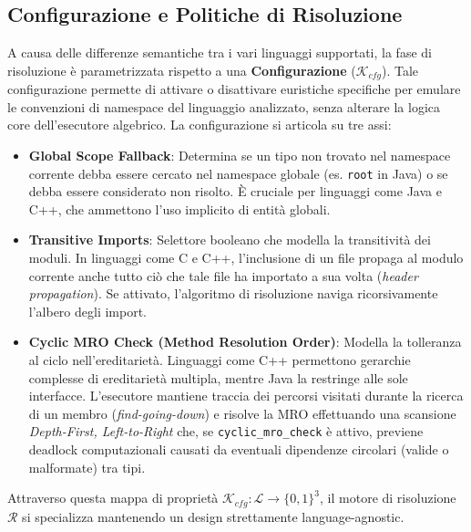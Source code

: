 \subsection{Configurazione e Politiche di Risoluzione}
A causa delle differenze semantiche tra i vari linguaggi supportati, la fase di
risoluzione è parametrizzata rispetto a una \textbf{Configurazione}
($\mathcal{K}_{cfg}$).
Tale configurazione permette di attivare o disattivare euristiche specifiche per
emulare le convenzioni di namespace del linguaggio analizzato, senza alterare
la logica core dell'esecutore algebrico. La configurazione si
articola su tre assi:
\begin{itemize}
  \item \textbf{Global Scope Fallback}: Determina se un tipo non
    trovato nel namespace corrente debba essere cercato nel namespace
    globale (es. \texttt{root} in Java) o se debba essere considerato
    non risolto. È cruciale per linguaggi come Java e C++, che
    ammettono l'uso implicito di entità globali.
  \item \textbf{Transitive Imports}: Selettore booleano che modella
    la transitività dei moduli. In linguaggi come C e C++,
    l'inclusione di un file propaga al modulo corrente anche tutto
    ciò che tale file ha importato a sua volta (\textit{header
    propagation}). Se attivato, l'algoritmo di risoluzione naviga
    ricorsivamente l'albero degli import.
  \item \textbf{Cyclic MRO Check (Method Resolution Order)}: Modella
    la tolleranza al ciclo nell'ereditarietà. Linguaggi come C++
    permettono gerarchie complesse di ereditarietà multipla, mentre
    Java la restringe alle sole interfacce. L'esecutore mantiene
    traccia dei percorsi visitati durante la ricerca di un membro
    (\textit{find-going-down}) e risolve la MRO effettuando una
    scansione \textit{Depth-First, Left-to-Right} che, se
    \texttt{cyclic\_mro\_check} è attivo, previene deadlock
    computazionali causati da eventuali dipendenze circolari (valide
    o malformate) tra tipi.
\end{itemize}
Attraverso questa mappa di proprietà $\mathcal{K}_{cfg}: \mathcal{L}
\to \{0,1\}^3$,
il motore di risoluzione $\mathcal{R}$ si specializza mantenendo un
design strettamente language-agnostic.

